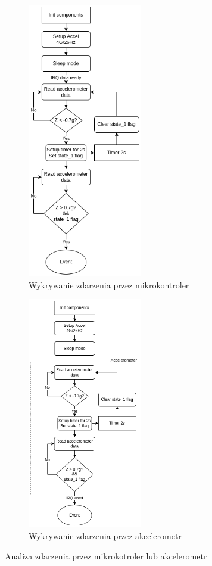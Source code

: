 \begin{figure}[h]
    \centering

    \begin{subfigure}[b]{5cm}
    \centering
    \includegraphics[width=5cm]{Graphics/Recognize_in_code.png}
    \caption{Wykrywanie zdarzenia przez mikrokontroler}
    \end{subfigure}%
    \hspace{3cm}
    \begin{subfigure}[b]{5cm}
    \centering
    \includegraphics[width=5cm]{Graphics/Recognize_in_code_acc.png}
    \caption{Wykrywanie zdarzenia przez akcelerometr}
    \end{subfigure}%
    \caption{Analiza zdarzenia przez mikrokotroler lub akcelerometr}
    \label{img:recognize}
\end{figure}

